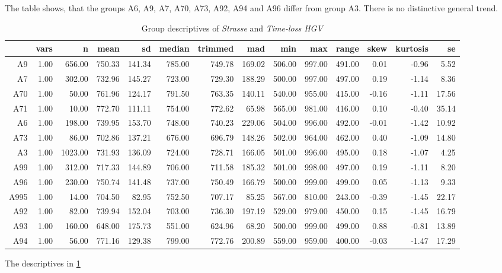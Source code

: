 The table shows, that the groups A6, A9, A7, A70, A73, A92, A94 and A96 differ from group A3. There is no distinctive general trend.
\begin{table}[ht!]
	\tiny
	\centering
	\begin{tabular}{rrrrrrrrrrrrrr}
		\hline
		& vars & n & mean & sd & median & trimmed & mad & min & max & range & skew & kurtosis & se \\ 
		\hline
		A9   & 1.00 & 656.00 & 750.33 & 141.34 & 785.00 & 749.78 & 169.02 & 506.00 & 997.00 & 491.00 & 0.01 & -0.96 & 5.52 \\ 
		A7   & 1.00 & 302.00 & 732.96 & 145.27 & 723.00 & 729.30 & 188.29 & 500.00 & 997.00 & 497.00 & 0.19 & -1.14 & 8.36 \\ 
		A70  & 1.00 & 50.00 & 761.96 & 124.17 & 791.50 & 763.35 & 140.11 & 540.00 & 955.00 & 415.00 & -0.16 & -1.11 & 17.56 \\ 
		A71  & 1.00 & 10.00 & 772.70 & 111.11 & 754.00 & 772.62 & 65.98 & 565.00 & 981.00 & 416.00 & 0.10 & -0.40 & 35.14 \\ 
		A6   & 1.00 & 198.00 & 739.95 & 153.70 & 748.00 & 740.23 & 229.06 & 504.00 & 996.00 & 492.00 & -0.01 & -1.42 & 10.92 \\ 
		A73  & 1.00 & 86.00 & 702.86 & 137.21 & 676.00 & 696.79 & 148.26 & 502.00 & 964.00 & 462.00 & 0.40 & -1.09 & 14.80 \\ 
		A3   & 1.00 & 1023.00 & 731.93 & 136.09 & 724.00 & 728.71 & 166.05 & 501.00 & 996.00 & 495.00 & 0.18 & -1.07 & 4.25 \\ 
		A99  & 1.00 & 312.00 & 717.33 & 144.89 & 706.00 & 711.58 & 185.32 & 501.00 & 998.00 & 497.00 & 0.19 & -1.11 & 8.20 \\ 
		A96  & 1.00 & 230.00 & 750.74 & 141.48 & 737.00 & 750.49 & 166.79 & 500.00 & 999.00 & 499.00 & 0.05 & -1.13 & 9.33 \\ 
		A995 & 1.00 & 14.00 & 704.50 & 82.95 & 752.50 & 707.17 & 85.25 & 567.00 & 810.00 & 243.00 & -0.39 & -1.45 & 22.17 \\ 
		A92  & 1.00 & 82.00 & 739.94 & 152.04 & 703.00 & 736.30 & 197.19 & 529.00 & 979.00 & 450.00 & 0.15 & -1.45 & 16.79 \\ 
		A93  & 1.00 & 160.00 & 648.00 & 175.73 & 551.00 & 624.96 & 68.20 & 500.00 & 999.00 & 499.00 & 0.88 & -0.81 & 13.89 \\ 
		A94  & 1.00 & 56.00 & 771.16 & 129.38 & 799.00 & 772.76 & 200.89 & 559.00 & 959.00 & 400.00 & -0.03 & -1.47 & 17.29 \\ 
		\bottomrule
	\end{tabular}
	\caption{Group descriptives of \textit{Strasse} and \textit{Time-loss HGV}}
	\label{tbl:descriptives_arbis_matched_Strasse_TMax}
\end{table}
The descriptives in \cref{tbl:descriptives_arbis_matched_Strasse_TMax}

